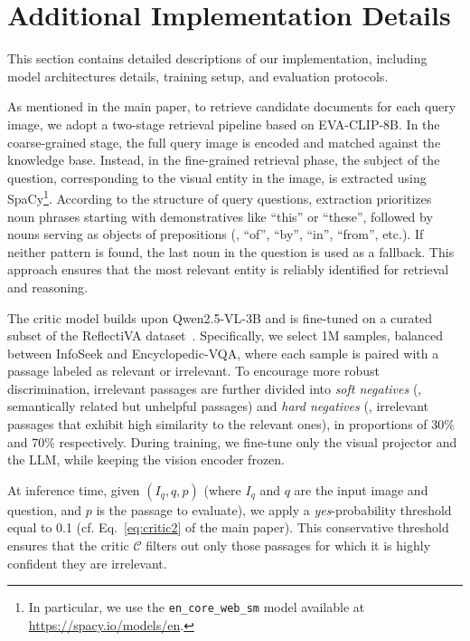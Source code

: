 \clearpage
\maketitlesupplementary
\appendix

\section{Additional Implementation Details}
\label{supp:details}

This section contains detailed descriptions of our implementation, including model architectures details, training setup, and evaluation protocols.

As mentioned in the main paper, to retrieve candidate documents for each query image, we adopt a two-stage retrieval pipeline based on EVA-CLIP-8B. In the coarse-grained stage, the full query image is encoded and matched against the knowledge base. Instead, in the fine-grained retrieval phase, the subject of the question, corresponding to the visual entity in the image, is extracted using SpaCy\footnote{In particular, we use the \texttt{en\_core\_web\_sm} model available at \url{https://spacy.io/models/en}.}. According to the structure of query questions, extraction prioritizes noun phrases starting with demonstratives like ``this'' or ``these'', followed by nouns serving as objects of prepositions (\eg, ``of'', ``by'', ``in'', ``from'', etc.). If neither pattern is found, the last noun in the question is used as a fallback. This approach ensures that the most relevant entity is reliably identified for retrieval and reasoning.

The critic model builds upon Qwen2.5-VL-3B and is fine-tuned on a curated subset of the ReflectiVA dataset~\cite{cocchi2025augmenting}. Specifically, we select 1M samples, balanced between InfoSeek and Encyclopedic-VQA, where each sample is paired with a passage labeled as relevant or irrelevant. To encourage more robust discrimination, irrelevant passages are further divided into \textit{soft negatives} (\ie, semantically related but unhelpful passages) and \textit{hard negatives} (\ie, irrelevant passages that exhibit high similarity to the relevant ones), in proportions of 30\% and 70\% respectively. During training, we fine-tune only the visual projector and the LLM, while keeping the vision encoder frozen.

At inference time, given $(I_{q}, q, p)$ (where $I_{q}$ and $q$ are the input image and question, and $p$ is the passage to evaluate), we apply a \emph{yes}-probability threshold equal to 0.1 (cf. Eq.~\ref{eq:critic2} of the main paper). This conservative threshold ensures that the critic $\mathcal{C}$ filters out only those passages for which it is highly confident they are irrelevant.

